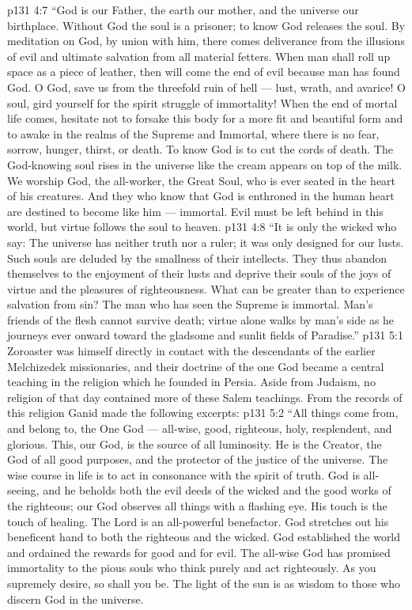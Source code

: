 \vs p131 4:7 “God is our Father, the earth our mother, and the universe our birthplace. Without God the soul is a prisoner; to know God releases the soul. By meditation on God, by union with him, there comes deliverance from the illusions of evil and ultimate salvation from all material fetters. When man shall roll up space as a piece of leather, then will come the end of evil because man has found God. O God, save us from the threefold ruin of hell --- lust, wrath, and avarice! O soul, gird yourself for the spirit struggle of immortality! When the end of mortal life comes, hesitate not to forsake this body for a more fit and beautiful form and to awake in the realms of the Supreme and Immortal, where there is no fear, sorrow, hunger, thirst, or death. To know God is to cut the cords of death. The God\hyp{}knowing soul rises in the universe like the cream appears on top of the milk. We worship God, the all\hyp{}worker, the Great Soul, who is ever seated in the heart of his creatures. And they who know that God is enthroned in the human heart are destined to become like him --- immortal. Evil must be left behind in this world, but virtue follows the soul to heaven.
\vs p131 4:8 “It is only the wicked who say: The universe has neither truth nor a ruler; it was only designed for our lusts. Such souls are deluded by the smallness of their intellects. They thus abandon themselves to the enjoyment of their lusts and deprive their souls of the joys of virtue and the pleasures of righteousness. What can be greater than to experience salvation from sin? The man who has seen the Supreme is immortal. Man’s friends of the flesh cannot survive death; virtue alone walks by man’s side as he journeys ever onward toward the gladsome and sunlit fields of Paradise.”
\vs p131 5:1 Zoroaster was himself directly in contact with the descendants of the earlier Melchizedek missionaries, and their doctrine of the one God became a central teaching in the religion which he founded in Persia. Aside from Judaism, no religion of that day contained more of these Salem teachings. From the records of this religion Ganid made the following excerpts:
\vs p131 5:2 \pc “All things come from, and belong to, the One God --- all\hyp{}wise, good, righteous, holy, resplendent, and glorious. This, our God, is the source of all luminosity. He is the Creator, the God of all good purposes, and the protector of the justice of the universe. The wise course in life is to act in consonance with the spirit of truth. God is all\hyp{}seeing, and he beholds both the evil deeds of the wicked and the good works of the righteous; our God observes all things with a flashing eye. His touch is the touch of healing. The Lord is an all\hyp{}powerful benefactor. God stretches out his beneficent hand to both the righteous and the wicked. God established the world and ordained the rewards for good and for evil. The all\hyp{}wise God has promised immortality to the pious souls who think purely and act righteously. As you supremely desire, so shall you be. The light of the sun is as wisdom to those who discern God in the universe.

